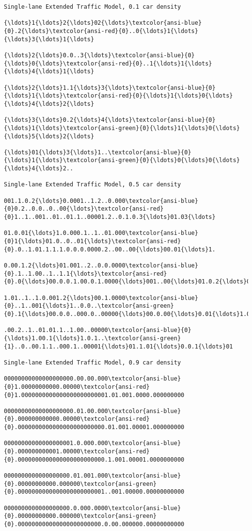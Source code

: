 \documentclass[11pt]{article}
\begin{document}
    \begin{Verbatim}[commandchars=\\\{\},fontsize=\footnotesize]
Single-lane Extended Traffic Model, 0.1 car density

{\ldots}1{\ldots}2{\ldots}02{\ldots}\textcolor{ansi-blue}{0}.2{\ldots}\textcolor{ansi-red}{0}..0{\ldots}1{\ldots}{\ldots}3{\ldots}1{\ldots}

{\ldots}2{\ldots}0.0..3{\ldots}\textcolor{ansi-blue}{0}{\ldots}0{\ldots}\textcolor{ansi-red}{0}..1{\ldots}1{\ldots}{\ldots}4{\ldots}1{\ldots}

{\ldots}2{\ldots}1.1{\ldots}3{\ldots}\textcolor{ansi-blue}{0}{\ldots}1{\ldots}\textcolor{ansi-red}{0}{\ldots}1{\ldots}0{\ldots}{\ldots}4{\ldots}2{\ldots}

{\ldots}3{\ldots}0.2{\ldots}4{\ldots}\textcolor{ansi-blue}{0}{\ldots}1{\ldots}\textcolor{ansi-green}{0}{\ldots}1{\ldots}0{\ldots}{\ldots}5{\ldots}2{\ldots}

{\ldots}01{\ldots}3{\ldots}1..\textcolor{ansi-blue}{0}{\ldots}1{\ldots}\textcolor{ansi-green}{0}{\ldots}0{\ldots}0{\ldots}{\ldots}4{\ldots}2..

Single-lane Extended Traffic Model, 0.5 car density

001.1.0.2{\ldots}0.0001..1.2..0.000\textcolor{ansi-blue}{0}0.2..0.0..0..00{\ldots}\textcolor{ansi-red}{0}1..1..001..01..01.1..00001.2..0.1.0.3{\ldots}01.03{\ldots}

01.0.01{\ldots}1.0.000.1..1..01.000\textcolor{ansi-blue}{0}1{\ldots}01.0..0..01{\ldots}\textcolor{ansi-red}{0}.0..1.01.1.1.1.0.0.0.0000.2..00..00{\ldots}00.01{\ldots}1.

0.00.1.2{\ldots}01.001..2..0.0.0000\textcolor{ansi-blue}{0}.1..1.00..1..1.1{\ldots}\textcolor{ansi-red}{0}.0{\ldots}00.0.0.1.00.0.1.0000{\ldots}001..00{\ldots}01.0.2{\ldots}0

1.01..1..1.0.001.2{\ldots}00.1.0000\textcolor{ansi-blue}{0}..1..001{\ldots}1..0.0..\textcolor{ansi-green}{0}.1{\ldots}00.0.0..000.0..00000{\ldots}00.0.00{\ldots}0.01{\ldots}1.0

.00.2..1..01.01.1..1.00..00000\textcolor{ansi-blue}{0}{\ldots}1.00.1{\ldots}1.0.1..\textcolor{ansi-green}{1}..0..00.1.1..000.1..00001{\ldots}01.1.01{\ldots}0.0.1{\ldots}01

Single-lane Extended Traffic Model, 0.9 car density

00000000000000000000.00.00.000\textcolor{ansi-blue}{0}1.00000000000.00000\textcolor{ansi-red}{0}1.0000000000000000000000001.01.001.0000.000000000

00000000000000000000.01.00.000\textcolor{ansi-blue}{0}.000000000000.00000\textcolor{ansi-red}{0}.0000000000000000000000000.01.001.00001.000000000

00000000000000000001.0.000.000\textcolor{ansi-blue}{0}.000000000001.00000\textcolor{ansi-red}{0}.0000000000000000000000000.1.001.00001.0000000000

0000000000000000000.01.001.000\textcolor{ansi-blue}{0}.00000000000.000000\textcolor{ansi-green}{0}.0000000000000000000000001..001.00000.00000000000

0000000000000000000.0.000.0000\textcolor{ansi-blue}{0}.00000000000.000000\textcolor{ansi-green}{0}.000000000000000000000000.0.00.000000.00000000000
    \end{Verbatim}
\end{document}
